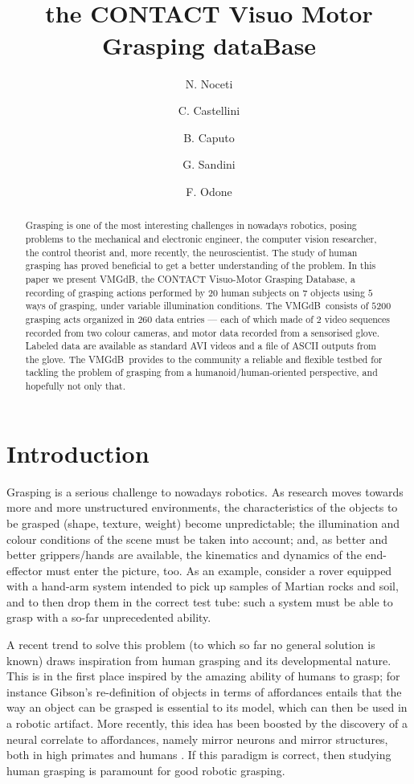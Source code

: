 \documentclass{article}
\title{\db\\the CONTACT Visuo Motor Grasping dataBase}
\author{N. Noceti \and C. Castellini \and B. Caputo \and G. Sandini \and F. Odone}
\newcommand{\db}{\textsf{VMGdB}}
\begin{document}
\maketitle

\begin{abstract}

 Grasping is one of the most interesting challenges in nowadays robotics, posing
 problems to the mechanical and electronic engineer, the computer vision researcher,
 the control theorist and, more recently, the neuroscientist. The study
 of human grasping has proved beneficial to get a better understanding of the problem.
 In this paper we present \db, the CONTACT Visuo-Motor Grasping Database, a recording
 of grasping actions performed by $20$ human subjects on $7$ objects using $5$ ways of
 grasping, under variable illumination conditions. The \db\ consists of $5200$ grasping
 acts organized in $260$ data entries --- each of which made of $2$ video sequences
 recorded from two colour cameras, and motor data recorded from a sensorised glove.
 Labeled data are available as standard AVI videos and a file of ASCII outputs from the glove.
 The \db\ provides to the community a reliable and flexible testbed for tackling the
 problem of grasping from a humanoid/human-oriented perspective, and hopefully not
 only that.

\end{abstract}

\section{Introduction}

Grasping is a serious challenge to nowadays robotics. As research moves towards
more and more unstructured environments, the characteristics of the objects to
be grasped (shape, texture, weight) become unpredictable; the illumination and
colour conditions of the scene must be taken into account; and, as better and
better grippers/hands are available, the kinematics and dynamics of the
end-effector must enter the picture, too. As an example, consider a rover equipped
with a hand-arm system intended to pick up samples of Martian rocks and soil, and
to then drop them in the correct test tube: such a system must be able to grasp
with a so-far unprecedented ability.

A recent trend to solve this problem (to which so far no general solution is known)
draws inspiration from human grasping and its developmental nature. This is in the
first place inspired by the amazing ability of humans to grasp; for instance Gibson's
re-definition of objects in terms of affordances \cite{gibson1,gibson2}
entails that the way an object can be grasped is essential to its model, which can
then be used in a robotic artifact. More recently, this idea has been boosted by
the discovery of a neural correlate to affordances, namely mirror neurons and
mirror structures, both in high primates and humans
\cite{gallese-96,umilta-01,rizzolatti-04,friston09}. If this paradigm is correct,
then studying human grasping is paramount for good robotic grasping.
\end{document}
